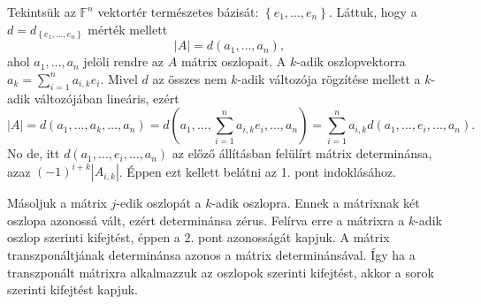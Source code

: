 \documentclass[a4paper, showtrims]{memoir}
\makeatletter
\renewenvironment{proof}[1][\proofname]
    {\par\pushQED{\qed}%
    \normalfont \topsep6\p@\@plus6\p@\relax
    \trivlist
    \item[\hskip\labelsep
        \itshape
    #1\@addpunct{:}]\ignorespaces}
    {\popQED\endtrivlist\@endpefalse}
\theoremstyle{plain}
\theoremstyle{remark}
\theoremstyle{definition}
\makeatother
\begin{document}
\begin{proof}
	Tekintsük az $\mathbb{F}^n$ vektortér természetes bázisát:
	$\left\{e_1,\ldots,e_n\right\}$. Láttuk, hogy a $d=d_{\left\{ e_1,\ldots,e_n\right\}}$
	mérték mellett
	\[
		|A|=d\left( a_1,\ldots,a_n \right),
	\]
	ahol $a_1,\ldots,a_n$ jelöli rendre az $A$ mátrix oszlopait.
	A $k$-adik oszlopvektorra $a_k=\sum_{i=1}^na_{i,k}e_i$.
	Mivel $d$ az összes nem $k$-adik változója rögzítése mellett a $k$-adik változójában lineáris,
	ezért
	\[
		|A|=d\left( a_1,\ldots,a_k,\ldots,a_n \right)
		=
		d\left( a_1,\ldots,\sum_{i=1}^na_{i,k}e_i,\ldots,a_n \right)
		=
		\sum_{i=1}^na_{i,k}d(a_1,\ldots,e_i,\ldots,a_n).
	\]
	No de, itt $d(a_1,\ldots,e_i,\ldots,a_n)$ az előző állításban felülírt mátrix determinánsa,
	azaz $\left( -1 \right)^{i+k}|A_{i,k}|$.
	Éppen ezt kellett belátni az 1. pont indoklásához.

	Másoljuk a mátrix $j$-edik oszlopát a $k$-adik oszlopra.
	Ennek a mátrixnak két oszlopa azonossá vált,
	ezért determinánsa zérus.
	Felírva erre a mátrixra a $k$-adik oszlop szerinti kifejtést,
	éppen a 2. pont azonosságát kapjuk.
\end{proof}
A mátrix transzponáltjának determinánsa azonos a mátrix determinánsával.
Így ha a transzponált mátrixra alkalmazzuk az oszlopok szerinti kifejtést,
akkor a sorok szerinti kifejtést kapjuk.
\end{document}
